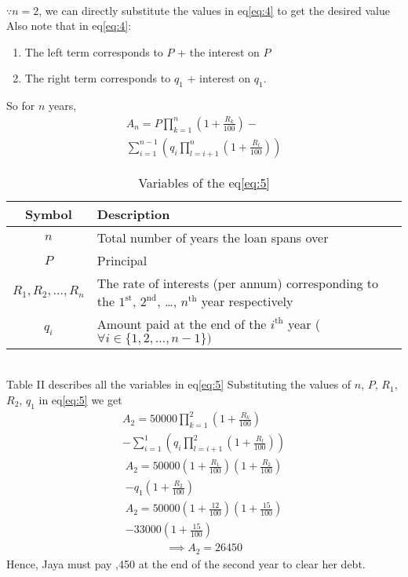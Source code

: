 \documentclass[journal,12pt,two column]{IEEEtran}
\begin{document}
\begin{enumerate}
\begin{multline}
\end{multline}
$\because n = 2$,
we can directly substitute the values in eq\eqref{eq:4} to get the desired value\\
Also note that in eq\eqref{eq:4}:
\begin{enumerate}
        \item The left term corresponds to $P$ + the interest on $P$
        \item The right term corresponds to $q_1$ + interest on $q_1$.
\end{enumerate}
So for $n$ years, 
\begin{multline}
\label{eq:5}
A_n = P\prod_{k = 1}^{n}{\left(1+\frac{R_k}{100}\right)} -\\ \sum_{i=1}^{n-1}{\left(q_i\prod_{l=i+1}^{n}{\left(1+\frac{R_l}{100}\right)}\right)}
\end{multline}
\begin{table}[h!]
\label{table:table2}
   \caption{Variables of the eq\eqref{eq:5}}
    \centering
    \begin{tabular}{|c|p{5.4cm}|}
    \hline
        \textbf{Symbol} & \textbf{Description}  \\
    \hline
        $n$ & Total number of years the loan spans over\\
    \hline
        $P$ & Principal\\
    \hline
        $R_1, R_2, \ldots, R_n$ &  The rate of interests (per annum) corresponding to the $1^\text{st}$, $2^\text{nd}$, \ldots, $n^\text{th}$ year respectively\\
    \hline
        $q_i$ & Amount paid at the end of the  $i^\text{th}$ year ( $\forall i\in \{1,2,\ldots,n-1\})$\\
    \hline
    \end{tabular}
    \label{tab:my_label}
\end{table}\\
Table II describes all the variables in eq\eqref{eq:5}
Substituting the values of
$n$, $P$, $R_1$, $R_2$, $q_1$ in eq\eqref{eq:5} we get
 \begin{multline}
    A_2 = 50000 \prod_{k = 1}^{2}  {\left(  1+\frac{R_k}{100}     \right)} \\ - \sum_{i=1}^{1}{\left(q_i\prod_{l=i+1}^{2}{\left(1+\frac{R_l}{100}\right)}\right)}
\end{multline}
\begin{multline}
    A_2 =50000\left(1+\frac{R_1}{100}\right)\left(1+\frac{R_2}{100}\right)\\ - q_1\left(1+\frac{R_2}{100}\right)
\end{multline}
\begin{multline}
       A_2  =50000\left(1+\frac{12}{100}\right)\left(1+\frac{15}{100}\right) \\ - 33000\left(1+\frac{15}{100}\right)
\end{multline}
\begin{align}
   \implies A_2 = 26450
\end{align}
Hence, Jaya must pay ,450 at the end of the second year to clear her debt.
\end{enumerate}
\end{document}
